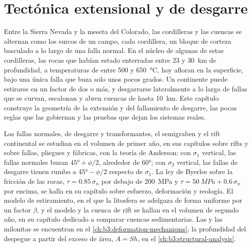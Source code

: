 \chapter{Tectónica extensional y de desgarre}\label{ch:b3:extension-strike-slip}

Entre la Sierra Nevada y la meseta del Colorado, las cordilleras y las cuencas
se alternan como los surcos de un campo, cada cordillera, un bloque de corteza basculado
a lo largo de una falla normal. En el núcleo de algunas de estas cordilleras, las rocas que habían estado
enterradas entre 23 y \qty{30}{km} de profundidad, a temperaturas de entre 500 y \qty{650}{\celsius}, hoy afloran en la
superficie, bajo una única falla que buza solo unos pocos grados.
Un continente puede estirarse en un factor de dos o más, y desgarrarse lateralmente a lo largo de fallas
que se curvan, escalonan y abren cuencas de hasta \qty{10}{km}. Este capítulo construye
la geometría de la extensión y del fallamiento de desgarre, las pocas reglas que
las gobiernan y las pruebas que dejan los sistemas reales.

\begin{recall}
Las fallas normales, de desgarre y transformantes, el semigraben y el rift continental
se estudian en el volumen de primer año, en sus capítulos sobre rifts y sobre fallas, pliegues
y fábricas, con la teoría de Anderson: con $\sigma_1$ vertical, las fallas normales
buzan $\ang{45} + \phi/2$, alrededor de \ang{60}; con $\sigma_2$ vertical, las
fallas de desgarre tienen rumbo a $\ang{45} - \phi/2$ respecto de $\sigma_1$. La ley de Byerlee sobre la
fricción de las rocas, $\tau = 0.85\,\sigma_n$ por debajo de \qty{200}{MPa} y $\tau =
\qty{50}{MPa} + 0.6\,\sigma_n$ por encima, se halla en su capítulo sobre esfuerzo, deformación y
reología. El modelo de estiramiento, en el que la litosfera se adelgaza de forma uniforme
por un factor $\beta$, y el modelo y la cuenca de rift se hallan en el volumen de segundo año, en su
capítulo dedicado a comparar cuencas sedimentarias. Las  y las milonitas se encuentran en el
\cref{ch:b3:deformation-mechanisms}; la profundidad del despegue a partir del exceso
de área, $A = Sh$, en el \cref{ch:b3:structural-analysis}.
\end{recall}

